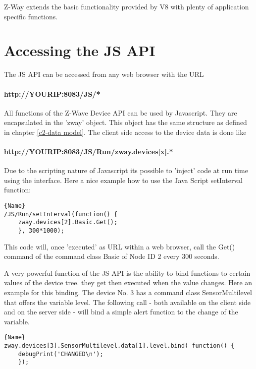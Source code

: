 Z-Way extends the basic functionality provided by V8 with plenty of application 
specific functions.

\section{Accessing the JS API}

The JS API can be accessed from any web browser with the URL

\paragraph{http://YOURIP:8083/JS/*}

All functions of the Z-Wave Device API can be used by Javascript. They are encapsulated
in the 'zway' object.  This object has the same structure as defined in chapter 
\ref{c2-data model}. 
The client side access to the device data is done like

\paragraph{http://YOURIP:8083/JS/Run/zway.devices[x].*}

Due to the scripting nature of Javascript its possible to 'inject' code at run time
using the interface. Here a nice example how to use the Java Script 
setInterval function:

\begin{lstlisting}[caption=Set Interval]{Name}
/JS/Run/setInterval(function() { 
	zway.devices[2].Basic.Get();
	}, 300*1000);
\end{lstlisting}

This code will, once 'executed' as URL within a web browser, call the Get() command
of the command class Basic of Node ID 2 every 300 seconds.  

A very powerful function of the JS API is the ability to bind functions to certain
values of the device tree. they get then executed when the value changes. Here an 
example for this binding. The device No. 3 has a command class SensorMultilevel that offers
the variable level. The following call - both available on the client side 
and on the server side - will bind a simple alert function to the change of 
the variable.

\begin{lstlisting}[caption=Bind a function]{Name}
zway.devices[3].SensorMultilevel.data[1].level.bind( function() { 
	debugPrint('CHANGED\n'); 
	});  
\end{lstlisting}

